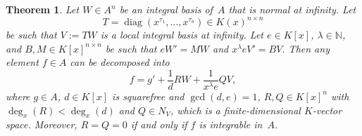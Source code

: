 \documentclass[final,1p,times,authoryear]{elsarticle}
\newtheorem{theorem}{Theorem}
\newcommand{\bN}{ {\mathbb N}}
\def\diag{\operatorname{diag}}
\begin{document}
\begin{theorem}\label{THM:polyred}
Let $W\in A^n$ be an integral basis of~$A$ that is normal at infinity.
Let
\[
T = \diag(x^{\tau_1}, \ldots, x^{\tau_n}) \in K(x)^{n\times n}
\]
be such that $V := TW$ is a local integral basis at infinity.  Let $e\in K[x]$,
$\lambda \in \bN$, and $B, M \in K[x]^{n \times n} $ be such that $eW' = MW$
and $x^\lambda eV' = BV$.  Then any element $f\in A$ can be decomposed into
\begin{equation}\label{EQ:add}
  f = g' + \frac{1}{d} RW + \frac{1}{x^\lambda e} QV,
\end{equation}
where $g\in A$, $d\in K[x]$ is squarefree and $\gcd(d, e)=1$, $R, Q\in K[x]^n$
with $\deg_x(R) < \deg_x(d)$ and $Q\in N_V$, which is a finite-dimensional
$K$-vector space. Moreover, $R=Q=0$ if and only if $f$ is integrable in~$A$.
\end{theorem}
\end{document}
